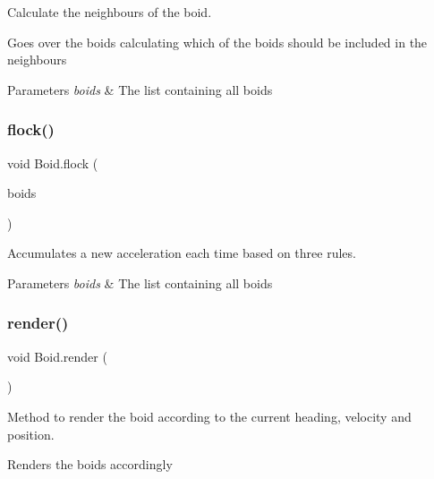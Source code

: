 Calculate the neighbours of the boid. 

Goes over the boids calculating which of the boids should be included in the neighbours 
\begin{DoxyParams}{Parameters}
{\em boids} & The list containing all boids \\
\hline
\end{DoxyParams}
\mbox{\label{class_boid_a7a31874a995e7439e894dc0141979ab2}} 
\subsubsection{\texorpdfstring{flock()}{flock()}}
{\footnotesize\ttfamily void Boid.\+flock (\begin{DoxyParamCaption}\item[{Array\+List$<$ \mbox{\hyperlink{class_boid}{Boid}} $>$}]{boids }\end{DoxyParamCaption})\hspace{0.3cm}{\ttfamily [inline]}}



Accumulates a new acceleration each time based on three rules. 


\begin{DoxyParams}{Parameters}
{\em boids} & The list containing all boids \\
\hline
\end{DoxyParams}
\mbox{\label{class_boid_a3dcde93686101c36fbf97a0dd2f2743b}} 
\subsubsection{\texorpdfstring{render()}{render()}}
{\footnotesize\ttfamily void Boid.\+render (\begin{DoxyParamCaption}{ }\end{DoxyParamCaption})\hspace{0.3cm}{\ttfamily [inline]}}



Method to render the boid according to the current heading, velocity and position. 

Renders the boids accordingly \mbox{\label{class_boid_ae286f6aa9f01bed28bc379200c3d7885}} 
